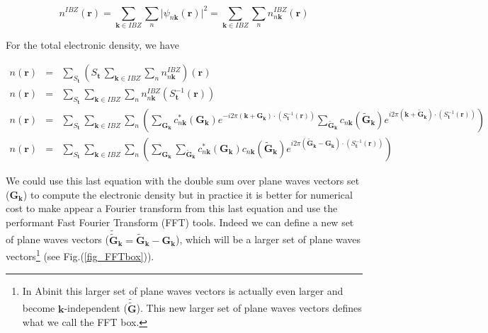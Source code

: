 \documentclass[a4paper,12pt]{report}
\begin{document}
\begin{equation}
n^{IBZ}(\mathbf{r}) = \sum_{\mathbf{k} \in IBZ} \sum_n \vert \psi_{n\mathbf{k}}(\mathbf{r}) \vert^2 = \sum_{\mathbf{k} \in IBZ} \sum_n n^{IBZ}_{n\mathbf{k}}(\mathbf{r})
\end{equation}

For the total electronic density, we have

\begin{eqnarray}
n(\mathbf{r}) &=& \sum_{S_{\mathbf{t}}} \left( S_{\mathbf{t}}\, \sum_{\mathbf{k} \in IBZ} \sum_n n^{IBZ}_{n\mathbf{k}} \right) (\mathbf{r}) \label{eqnIBZr2}\\
n(\mathbf{r}) &=& \sum_{S_{\mathbf{t}}} \sum_{\mathbf{k} \in IBZ} \sum_n n^{IBZ}_{n\mathbf{k}} (S_{\mathbf{t}}^{-1} (\mathbf{r})) \nonumber\\
n(\mathbf{r}) &=& \sum_{S_{\mathbf{t}}} \sum_{\mathbf{k} \in IBZ} \sum_n \left( \sum_{\mathbf{G}_{\mathbf{k}}} c_{n\mathbf{k}}^{*}(\mathbf{G}_{\mathbf{k}}) e^{-i2\pi \left( \mathbf{k} + \mathbf{G}_{\mathbf{k}}\right)\cdotp \left( S_{\mathbf{t}}^{-1} (\mathbf{r})\right) } \sum_{\tilde{\mathbf{G}}_{\mathbf{k}}} c_{n\mathbf{k}}(\tilde{\mathbf{G}}_{\mathbf{k}}) e^{i2\pi \left( \mathbf{k} + \tilde{\mathbf{G}}_{\mathbf{k}}\right)\cdotp \left( S_{\mathbf{t}}^{-1} (\mathbf{r})\right) } \right) \nonumber\\
n(\mathbf{r}) &=& \sum_{S_{\mathbf{t}}} \sum_{\mathbf{k} \in IBZ} \sum_n \left( \sum_{\mathbf{G}_{\mathbf{k}}} \sum_{\tilde{\mathbf{G}}_{\mathbf{k}}} c_{n\mathbf{k}}^{*}(\mathbf{G}_{\mathbf{k}}) c_{n\mathbf{k}}(\tilde{\mathbf{G}}_{\mathbf{k}}) e^{i2\pi \left( \tilde{\mathbf{G}}_{\mathbf{k}} -\mathbf{G}_{\mathbf{k}} \right)\cdotp \left( S_{\mathbf{t}}^{-1} (\mathbf{r})\right) } \right)
\end{eqnarray}

We could use this last equation with the double sum over plane waves vectors set ($\mathbf{G}_{\mathbf{k}}$) to compute the electronic density but in practice it is better for numerical cost to make appear a Fourier transform from this last equation and use the performant Fast Fourier Transform (FFT) tools. Indeed we can define a new set of plane waves vectors ($\tilde{\tilde{\mathbf{G}}}_{\mathbf{k}} = \tilde{\mathbf{G}}_{\mathbf{k}} -\mathbf{G}_{\mathbf{k}}$), which will be a larger set of plane waves vectors\footnote{ In Abinit this larger set of plane waves vectors is actually even larger and become $\mathbf{k}$-independent ($\tilde{\tilde{\mathbf{G}}}$). This new larger set of plane waves vectors defines what we call the FFT box.} (see Fig.(\ref{fig_FFTbox})).\\
\end{document}
